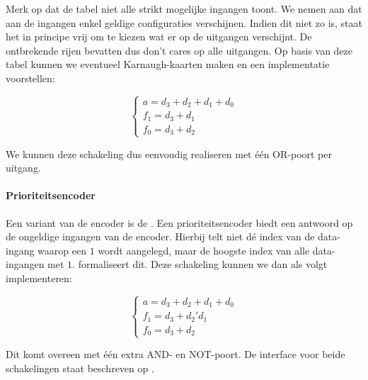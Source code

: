 Merk op dat de tabel niet alle strikt mogelijke ingangen toont. We nemen aan dat aan de ingangen enkel geldige configuraties verschijnen. Indien dit niet zo is, staat het in principe vrij om te kiezen wat er op de uitgangen verschijnt. De ontbrekende rijen bevatten dus don't cares op alle uitgangen. Op basis van deze tabel kunnen we eventueel Karnaugh-kaarten maken en een implementatie voorstellen:

\begin{equation}
\left\{
\begin{array}{l}
a=d_3+d_2+d_1+d_0\\
f_1=d_3+d_1\\
f_0=d_3+d_2
\end{array}
\right.
\end{equation}

We kunnen deze schakeling dus eenvoudig realiseren met \'e\'en OR-poort per uitgang.

\paragraph{Prioriteitsencoder}
Een variant van de encoder is de . Een prioriteitsencoder biedt een antwoord op de ongeldige ingangen van de encoder. Hierbij telt niet d\'e index van de data-ingang waarop een $1$ wordt aangelegd, maar de hoogste index van alle data-ingangen met $1$.  formaliseert dit. Deze schakeling kunnen we dan als volgt implementeren:

\begin{equation}
\left\{
\begin{array}{l}
a=d_3+d_2+d_1+d_0\\
f_1=d_3+d_2'd_1\\
f_0=d_3+d_2
\end{array}
\right.
\end{equation}

Dit komt overeen met \'e\'en extra AND- en NOT-poort. De interface voor beide schakelingen staat beschreven op .

